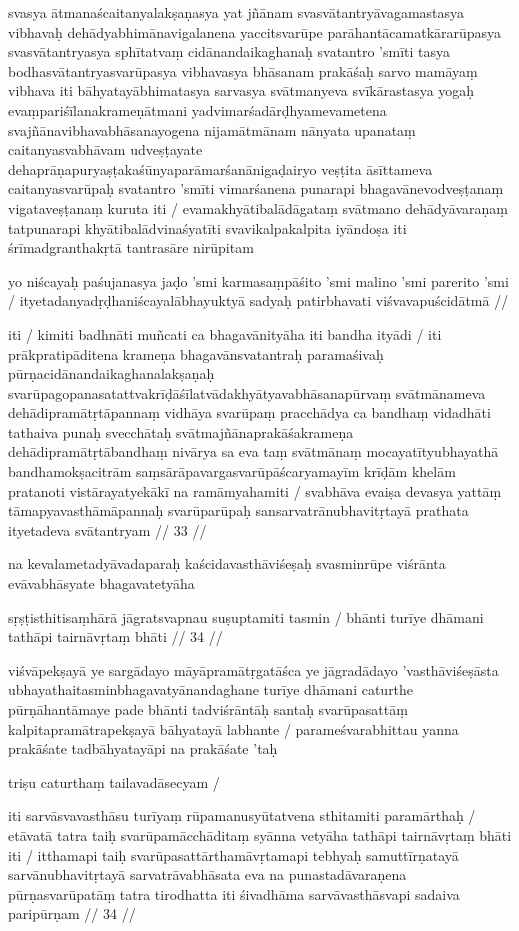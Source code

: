 svasya ātmanaścaitanyalakṣaṇasya yat jñānam svasvātantryāvagamastasya vibhavaḥ dehādyabhimānavigalanena yaccitsvarūpe parāhantācamatkārarūpasya svasvātantryasya sphītatvaṃ cidānandaikaghanaḥ svatantro 'smīti tasya bodhasvātantryasvarūpasya vibhavasya bhāsanam prakāśaḥ sarvo mamāyaṃ vibhava iti bāhyatayābhimatasya sarvasya svātmanyeva svīkārastasya yogaḥ evaṃpariśīlanakrameṇātmani yadvimarśadārḍhyamevametena svajñānavibhavabhāsanayogena nijamātmānam nānyata upanataṃ caitanyasvabhāvam udveṣṭayate dehaprāṇapuryaṣṭakaśūnyaparāmarśanānigaḍairyo veṣṭita āsīttameva caitanyasvarūpaḥ svatantro 'smīti vimarśanena punarapi bhagavānevodveṣṭanaṃ vigataveṣṭanaṃ kuruta iti  / evamakhyātibalādāgataṃ svātmano dehādyāvaraṇaṃ tatpunarapi khyātibalādvinaśyatīti svavikalpakalpita iyāndoṣa iti śrīmadgranthakṛtā tantrasāre nirūpitam

yo niścayaḥ paśujanasya jaḍo 'smi karmasaṃpāśito 'smi malino 'smi parerito 'smi  /
ityetadanyadṛḍhaniścayalābhayuktyā sadyaḥ patirbhavati viśvavapuścidātmā  //

iti  / kimiti badhnāti muñcati ca bhagavānityāha iti bandha ityādi  / iti prākpratipāditena krameṇa bhagavānsvatantraḥ paramaśivaḥ pūrṇacidānandaikaghanalakṣaṇaḥ svarūpagopanasatattvakrīḍāśīlatvādakhyātyavabhāsanapūrvaṃ svātmānameva dehādipramātṛtāpannaṃ vidhāya svarūpaṃ pracchādya ca bandhaṃ vidadhāti tathaiva punaḥ svecchātaḥ svātmajñānaprakāśakrameṇa dehādipramātṛtābandhaṃ nivārya sa eva taṃ svātmānaṃ mocayatītyubhayathā bandhamokṣacitrām saṃsārāpavargasvarūpāścaryamayīm krīḍām khelām pratanoti vistārayatyekākī na ramāmyahamiti  / svabhāva evaiṣa devasya yattāṃ tāmapyavasthāmāpannaḥ svarūparūpaḥ sansarvatrānubhavitṛtayā prathata ityetadeva svātantryam  // 33  //

na kevalametadyāvadaparaḥ kaścidavasthāviśeṣaḥ svasminrūpe viśrānta evāvabhāsyate bhagavatetyāha

sṛṣṭisthitisaṃhārā jāgratsvapnau suṣuptamiti tasmin  /
bhānti turīye dhāmani tathāpi tairnāvṛtaṃ bhāti  // 34  //

viśvāpekṣayā ye sargādayo māyāpramātṛgatāśca ye jāgradādayo 'vasthāviśeṣāsta ubhayathaitasminbhagavatyānandaghane turīye dhāmani caturthe pūrṇāhantāmaye pade bhānti tadviśrāntāḥ santaḥ svarūpasattāṃ kalpitapramātrapekṣayā bāhyatayā labhante  / parameśvarabhittau yanna prakāśate tadbāhyatayāpi na prakāśate 'taḥ

triṣu caturthaṃ tailavadāsecyam  /

iti sarvāsvavasthāsu turīyaṃ rūpamanusyūtatvena sthitamiti paramārthaḥ  / etāvatā tatra taiḥ svarūpamācchāditaṃ syānna vetyāha tathāpi tairnāvṛtaṃ bhāti iti  / itthamapi taiḥ svarūpasattārthamāvṛtamapi tebhyaḥ samuttīrṇatayā sarvānubhavitṛtayā sarvatrāvabhāsata eva na punastadāvaraṇena pūrṇasvarūpatāṃ tatra tirodhatta iti śivadhāma sarvāvasthāsvapi sadaiva paripūrṇam  // 34  //

